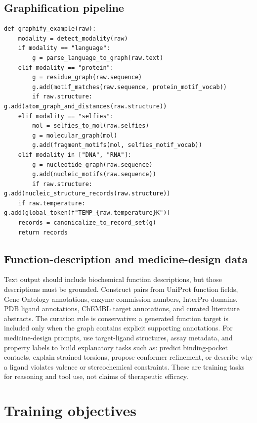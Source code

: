 \documentclass[11pt]{article}
\newcommand{\1}{\mathbf{1}}
\begin{document}
\subsection{Graphification pipeline}

\begin{lstlisting}[caption={End-to-end data graphification.}]
def graphify_example(raw):
    modality = detect_modality(raw)
    if modality == "language":
        g = parse_language_to_graph(raw.text)
    elif modality == "protein":
        g = residue_graph(raw.sequence)
        g.add(motif_matches(raw.sequence, protein_motif_vocab))
        if raw.structure: g.add(atom_graph_and_distances(raw.structure))
    elif modality == "selfies":
        mol = selfies_to_mol(raw.selfies)
        g = molecular_graph(mol)
        g.add(fragment_motifs(mol, selfies_motif_vocab))
    elif modality in ["DNA", "RNA"]:
        g = nucleotide_graph(raw.sequence)
        g.add(nucleic_motifs(raw.sequence))
        if raw.structure: g.add(nucleic_structure_records(raw.structure))
    if raw.temperature: g.add(global_token(f"TEMP_{raw.temperature}K"))
    records = canonicalize_to_record_set(g)
    return records
\end{lstlisting}

\subsection{Function-description and medicine-design data}

Text output should include biochemical function descriptions, but those descriptions must be grounded. Construct pairs from UniProt function fields, Gene Ontology annotations, enzyme commission numbers, InterPro domains, PDB ligand annotations, ChEMBL target annotations, and curated literature abstracts. The curation rule is conservative: a generated function target is included only when the graph contains explicit supporting annotations. For medicine-design prompts, use target-ligand structures, assay metadata, and property labels to build explanatory tasks such as: predict binding-pocket contacts, explain strained torsions, propose conformer refinement, or describe why a ligand violates valence or stereochemical constraints. These are training tasks for reasoning and tool use, not claims of therapeutic efficacy.

\section{Training objectives}
\end{document}

